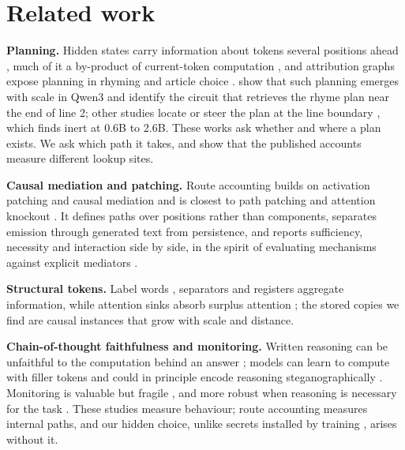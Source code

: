 \documentclass[
]{article}
\begin{document}
\section{Related work}\label{sec-related}

\textbf{Planning.} Hidden states carry information about tokens several
positions ahead \citep{pal2023futurelens, men2024lookahead}, much of it
a by-product of current-token computation \citep{wu2024plan}, and
attribution graphs \citep{ameisen2025attribution} expose planning in
rhyming \citep{lindsey2025biology} and article choice
\citep{hanna2026latent}. \citet{hanna2026latent} show that such planning
emerges with scale in Qwen3 and identify the circuit that retrieves the
rhyme plan near the end of line 2; other studies locate or steer the
plan at the line boundary \citep{maar2026plan, ma2026plan}, which
\citet{jacopin2026improvisation} finds inert at 0.6B to 2.6B. These
works ask whether and where a plan exists. We ask which path it takes,
and show that the published accounts measure different lookup sites.

\textbf{Causal mediation and patching.} Route accounting builds on
activation patching and causal mediation
\citep{vig2020mediation, meng2022rome, geiger2025abstraction, chan2022scrubbing, zhang2024patching, heimersheim2024patching}
and is closest to path patching
\citep{wang2023ioi, goldowskydill2023path} and attention knockout
\citep{geva2023recall}. It defines paths over positions rather than
components, separates emission through generated text from persistence,
and reports sufficiency, necessity and interaction side by side, in the
spirit of evaluating mechanisms against explicit mediators
\citep{mueller2026mediator}.

\textbf{Structural tokens.} Label words \citep{wang2023labelwords},
separators \citep{chen2024sepllm} and registers
\citep{darcet2024registers} aggregate information, while attention sinks
absorb surplus attention \citep{xiao2024sinks}; the stored copies we
find are causal instances that grow with scale and distance.

\textbf{Chain-of-thought faithfulness and monitoring.} Written reasoning
can be unfaithful to the computation behind an answer
\citep{turpin2023unfaithful, lanham2023faithfulness, chen2025reasoning};
models can learn to compute with filler tokens \citep{pfau2024dots} and
could in principle encode reasoning steganographically
\citep{roger2023steganography}. Monitoring is valuable but fragile
\citep{korbak2025monitorability, baker2025monitoring}, and more robust
when reasoning is necessary for the task \citep{emmons2025cot}. These
studies measure behaviour; route accounting measures internal paths, and
our hidden choice, unlike secrets installed by training
\citep{cywinski2025taboo}, arises without it.
\end{document}
